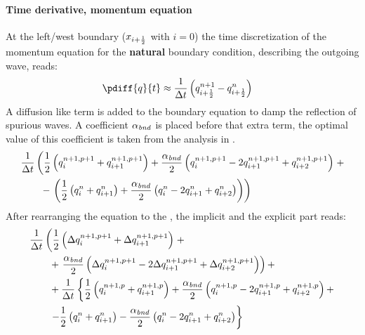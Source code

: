 \paragraph*{Time derivative, momentum equation}
At the left/west boundary ($x_{i+\frac{1}{2}}$ with $i=0$) the time discretization of the momentum equation for the \textbf{natural} boundary condition, describing the outgoing wave, reads:
\begin{align}
    \pdiff{q}{t} & \approx \frac{1}{\Dt} \left(  q^{n+1}_{i+\half} - q^{n}_{i+\half} \right)
\end{align}
A diffusion like term is added to the boundary equation to damp the reflection of spurious waves.
A coefficient $\alpha_{\it bnd}$ is placed before that extra term, the optimal value of this coefficient is taken from the analysis in \citet{transpeq-analysisdiscretizationinsidedomain_boundaries.mw}.
\begin{align}
    & \frac{1}{\Delta t}\left( \frac{1}{2} \left( q^{n+1,p+1}_{i} + q^{n+1,p+1}_{i+1} \right)
    + \frac{\alpha_{\it bnd}}{2} \left( q^{n+1,p+1}_{i} - 2 q^{n+1,p+1}_{i+1} + q^{n+1,p+1}_{i+2}  \right) \right. +
    \nonumber \\*
    & \qquad  - \left. \left(
    \frac{1}{2} \left( q^{n}_{i} + q^{n}_{i+1} \right)
    + \frac{\alpha_{\it bnd}}{2}  \left( q^{n}_{i} - 2 q^{n}_{i+1} + q^{n}_{i+2}  \right) \right)
    \right)
\end{align}
After rearranging the equation to the \deltaformulation, the implicit and the explicit part reads:
\begin{align}
    & \frac{1}{\Delta t}  \left( \frac{1}{2} \left( \Delta q^{n+1, p+1}_{i} + \Delta q^{n+1, p+1}_{i+1} \right) \right. +
    \nonumber \\*
    & \qquad + \left. \frac{\alpha_{\it bnd}}{2}\left( \Delta q^{n+1,p+1}_{i} - 2 \Delta q^{n+1,p+1}_{i+1} + \Delta q^{n+1,p+1}_{i+2} \right) \right) +
    \nonumber \\
    & \qquad +  \frac{1}{\Delta t} \left\{ \frac{1}{2} \left( q^{n+1, p}_{i} + q^{n+1, p}_{i+1} \right) + \frac{\alpha_{\it bnd}}{2}\left( q^{n+1,p}_{i} - 2 q^{n+1,p}_{i+1}  + q^{n+1,p}_{i+2} \right) + \right.
    \nonumber \\*
    & \qquad
    \left.  - \frac{1}{2} \left( q^{n}_{i} + q^{n}_{i+1} \right) - \frac{\alpha_{\it bnd}}{2} \left( q^{n}_{i} - 2 q^{n}_{i+1} + q^{n}_{i+2}  \right) \right\}
\end{align}
